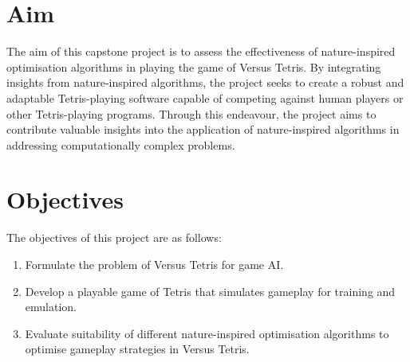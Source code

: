 \documentclass[a4paper, 12pt]{extreport}
\begin{document}
		\section{Aim}
		
			
			The aim of this capstone project is to assess the effectiveness of nature-inspired optimisation algorithms in playing the game of Versus Tetris. By integrating insights from nature-inspired algorithms, the project seeks to create a robust and adaptable Tetris-playing software capable of competing against human players or other Tetris-playing programs. Through this endeavour, the project aims to contribute valuable insights into the application of nature-inspired algorithms in addressing computationally complex problems.
		
		\section{Objectives}
		
			
			The objectives of this project are as follows:
			
			\begin{enumerate}
				\item Formulate the problem of Versus Tetris for game AI.
				\item Develop a playable game of Tetris that simulates gameplay for training and emulation.
				\item Evaluate suitability of different nature-inspired optimisation algorithms to optimise gameplay strategies in Versus Tetris.
			\end{enumerate}
		
\end{document}
